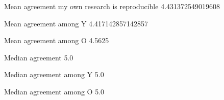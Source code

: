 
Mean agreement my own research is reproducible 4.431372549019608

Mean agreement among Y 4.417142857142857

Mean agreement among O 4.5625

Median agreement 5.0

Median agreement among Y 5.0

Median agreement among O 5.0
